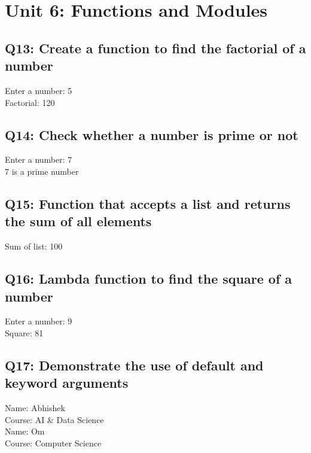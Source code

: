 \documentclass[11pt,a4paper]{article}
\begin{document}
\section{Unit 6: Functions and Modules}

\subsection{Q13: Create a function to find the factorial of a number}
\begin{outputbox}
Enter a number: 5\\
Factorial: 120
\end{outputbox}

\subsection{Q14: Check whether a number is prime or not}
\begin{outputbox}
Enter a number: 7\\
7 is a prime number
\end{outputbox}

\subsection{Q15: Function that accepts a list and returns the sum of all elements}
\begin{outputbox}
Sum of list: 100
\end{outputbox}

\subsection{Q16: Lambda function to find the square of a number}
\begin{outputbox}
Enter a number: 9\\
Square: 81
\end{outputbox}

\subsection{Q17: Demonstrate the use of default and keyword arguments}
\begin{outputbox}
Name: Abhishek\\
Course: AI \& Data Science\\
Name: Om\\
Course: Computer Science
\end{outputbox}
\end{document}
